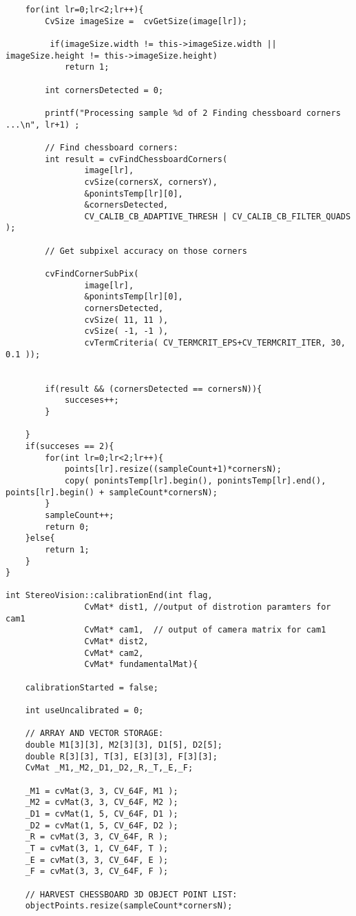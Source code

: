 \begin{lstlisting}
    for(int lr=0;lr<2;lr++){
        CvSize imageSize =  cvGetSize(image[lr]);

         if(imageSize.width != this->imageSize.width || imageSize.height != this->imageSize.height)
            return 1;

        int cornersDetected = 0;

        printf("Processing sample %d of 2 Finding chessboard corners ...\n", lr+1) ;

		// Find chessboard corners:
		int result = cvFindChessboardCorners(
				image[lr],
				cvSize(cornersX, cornersY),
				&ponintsTemp[lr][0],
				&cornersDetected,
				CV_CALIB_CB_ADAPTIVE_THRESH | CV_CALIB_CB_FILTER_QUADS );

		// Get subpixel accuracy on those corners

		cvFindCornerSubPix(
				image[lr],
				&ponintsTemp[lr][0],
				cornersDetected,
				cvSize( 11, 11 ),
				cvSize( -1, -1 ),
				cvTermCriteria( CV_TERMCRIT_EPS+CV_TERMCRIT_ITER, 30, 0.1 ));


        if(result && (cornersDetected == cornersN)){
            succeses++;
        }

    }
    if(succeses == 2){
        for(int lr=0;lr<2;lr++){
            points[lr].resize((sampleCount+1)*cornersN);
            copy( ponintsTemp[lr].begin(), ponintsTemp[lr].end(),  points[lr].begin() + sampleCount*cornersN);
        }
        sampleCount++;
        return 0;
    }else{
        return 1;
    }
}

int StereoVision::calibrationEnd(int flag,
				CvMat* dist1, //output of distrotion paramters for cam1
				CvMat* cam1,  // output of camera matrix for cam1
				CvMat* dist2,
				CvMat* cam2,
				CvMat* fundamentalMat){

    calibrationStarted = false;

    int useUncalibrated = 0;

    // ARRAY AND VECTOR STORAGE:
    double M1[3][3], M2[3][3], D1[5], D2[5];
    double R[3][3], T[3], E[3][3], F[3][3];
    CvMat _M1,_M2,_D1,_D2,_R,_T,_E,_F;

    _M1 = cvMat(3, 3, CV_64F, M1 );
    _M2 = cvMat(3, 3, CV_64F, M2 );
    _D1 = cvMat(1, 5, CV_64F, D1 );
    _D2 = cvMat(1, 5, CV_64F, D2 );
    _R = cvMat(3, 3, CV_64F, R );
    _T = cvMat(3, 1, CV_64F, T );
    _E = cvMat(3, 3, CV_64F, E );
    _F = cvMat(3, 3, CV_64F, F );

    // HARVEST CHESSBOARD 3D OBJECT POINT LIST:
    objectPoints.resize(sampleCount*cornersN);


\end{lstlisting}
